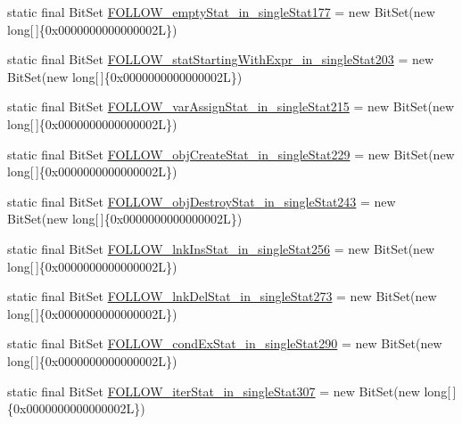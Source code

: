 \begin{DoxyCompactItemize}
\item 
static final Bit\-Set \hyperlink{classorg_1_1tzi_1_1use_1_1parser_1_1soil_1_1_soil_parser_adb3694ff1af102bbeb9413c5cededf5b}{F\-O\-L\-L\-O\-W\-\_\-empty\-Stat\-\_\-in\-\_\-single\-Stat177} = new Bit\-Set(new long\mbox{[}$\,$\mbox{]}\{0x0000000000000002\-L\})
\item 
static final Bit\-Set \hyperlink{classorg_1_1tzi_1_1use_1_1parser_1_1soil_1_1_soil_parser_a1c33a15fdd12c52bfd31891392562082}{F\-O\-L\-L\-O\-W\-\_\-stat\-Starting\-With\-Expr\-\_\-in\-\_\-single\-Stat203} = new Bit\-Set(new long\mbox{[}$\,$\mbox{]}\{0x0000000000000002\-L\})
\item 
static final Bit\-Set \hyperlink{classorg_1_1tzi_1_1use_1_1parser_1_1soil_1_1_soil_parser_ab20a291e8a8177cde0e30c2ab1da521e}{F\-O\-L\-L\-O\-W\-\_\-var\-Assign\-Stat\-\_\-in\-\_\-single\-Stat215} = new Bit\-Set(new long\mbox{[}$\,$\mbox{]}\{0x0000000000000002\-L\})
\item 
static final Bit\-Set \hyperlink{classorg_1_1tzi_1_1use_1_1parser_1_1soil_1_1_soil_parser_afc8412c47681b7b2b7adc5b364e0e8ce}{F\-O\-L\-L\-O\-W\-\_\-obj\-Create\-Stat\-\_\-in\-\_\-single\-Stat229} = new Bit\-Set(new long\mbox{[}$\,$\mbox{]}\{0x0000000000000002\-L\})
\item 
static final Bit\-Set \hyperlink{classorg_1_1tzi_1_1use_1_1parser_1_1soil_1_1_soil_parser_af7d81629fe91bbcfca07daa754f32b41}{F\-O\-L\-L\-O\-W\-\_\-obj\-Destroy\-Stat\-\_\-in\-\_\-single\-Stat243} = new Bit\-Set(new long\mbox{[}$\,$\mbox{]}\{0x0000000000000002\-L\})
\item 
static final Bit\-Set \hyperlink{classorg_1_1tzi_1_1use_1_1parser_1_1soil_1_1_soil_parser_a11f574b807745564007cc1a80ef3ec40}{F\-O\-L\-L\-O\-W\-\_\-lnk\-Ins\-Stat\-\_\-in\-\_\-single\-Stat256} = new Bit\-Set(new long\mbox{[}$\,$\mbox{]}\{0x0000000000000002\-L\})
\item 
static final Bit\-Set \hyperlink{classorg_1_1tzi_1_1use_1_1parser_1_1soil_1_1_soil_parser_a59496ffefebf1c51ecaf90f022308a7e}{F\-O\-L\-L\-O\-W\-\_\-lnk\-Del\-Stat\-\_\-in\-\_\-single\-Stat273} = new Bit\-Set(new long\mbox{[}$\,$\mbox{]}\{0x0000000000000002\-L\})
\item 
static final Bit\-Set \hyperlink{classorg_1_1tzi_1_1use_1_1parser_1_1soil_1_1_soil_parser_acdcdad02ae553b5024dfec93c7692693}{F\-O\-L\-L\-O\-W\-\_\-cond\-Ex\-Stat\-\_\-in\-\_\-single\-Stat290} = new Bit\-Set(new long\mbox{[}$\,$\mbox{]}\{0x0000000000000002\-L\})
\item 
static final Bit\-Set \hyperlink{classorg_1_1tzi_1_1use_1_1parser_1_1soil_1_1_soil_parser_a12341ee0fa1fea332032df84fea8909e}{F\-O\-L\-L\-O\-W\-\_\-iter\-Stat\-\_\-in\-\_\-single\-Stat307} = new Bit\-Set(new long\mbox{[}$\,$\mbox{]}\{0x0000000000000002\-L\})

\end{DoxyCompactItemize}

